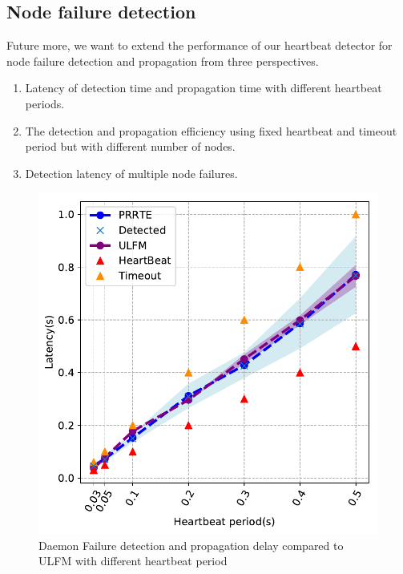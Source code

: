 \documentclass[sigconf]{acmart}
\newcommand{\ulfm}[0]{\textsc{ULFM}\xspace}
\begin{document}
\subsection{Node failure detection}
Future more, we want to extend the performance of our heartbeat detector  for node failure detection and propagation from  three perspectives. 
\begin{enumerate}
  \item Latency of detection time and propagation time with different heartbeat periods.
  \item The detection and propagation efficiency using fixed heartbeat and timeout period but with different number of nodes.
  \item Detection latency of multiple node failures.
\end{enumerate}

\begin{figure}[h]
  \centering
  \includegraphics[width=\linewidth]{PRRTE_ULFM_comparision.pdf}
  \caption{Daemon Failure detection and propagation delay compared to \ulfm with different heartbeat period}
\end{figure}
\end{document}
